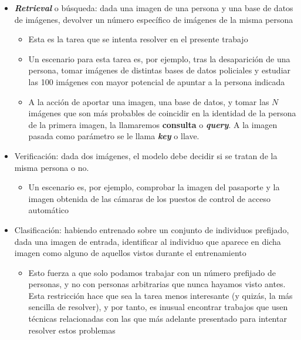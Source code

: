 \begin{itemize}
    \item \textbf{\textit{Retrieval}} o búsqueda: dada una imagen de una persona y una base de datos de imágenes, devolver un número específico de imágenes de la misma persona

        \begin{itemize}
            \item Esta es la tarea que se intenta resolver en el presente trabajo
            \item Un escenario para esta tarea es, por ejemplo, tras la desaparición de una persona, tomar imágenes de distintas bases de datos policiales y estudiar las 100 imágenes con mayor potencial de apuntar a la persona indicada
            \item A la acción de aportar una imagen, una base de datos, y tomar las $N$ imágenes que son más probables de coincidir en la identidad de la persona de la primera imagen, la llamaremos \textbf{consulta} o \textbf{\textit{query}}. A la imagen pasada como parámetro se le llama \textbf{\textit{key}} o llave.
        \end{itemize}

    \item Verificación: dada dos imágenes, el modelo debe decidir si se tratan de la misma persona o no.
        \begin{itemize}
            \item Un escenario es, por ejemplo, comprobar la imagen del pasaporte y la imagen obtenida de las cámaras de los puestos de control de acceso automático
        \end{itemize}

    \item Clasificación: habiendo entrenado sobre un conjunto de individuos prefijado, dada una imagen de entrada, identificar al individuo que aparece en dicha imagen como alguno de aquellos vistos durante el entrenamiento
        \begin{itemize}
            \item Esto fuerza a que solo podamos trabajar con un número prefijado de personas, y no con personas arbitrarias que nunca hayamos visto antes. Esta restricción hace que sea la tarea menos interesante (y quizás, la más sencilla de resolver), y por tanto, es inusual encontrar trabajos que usen técnicas relacionadas con las que más adelante presentado para intentar resolver estos problemas
        \end{itemize}
\end{itemize}

